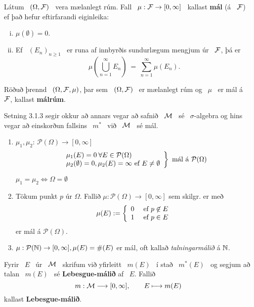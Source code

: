\documentclass[12pt]{report}
\newcommand{\cP}{\mathcal{P}}
\newcommand{\F}{{\cal F}}
\newcommand{\M}{{\cal M}}
\begin{document}
\begin{skgr*}
Látum  \ $(\Omega,\F)$ \ vera mælanlegt rúm. Fall \ $\mu : \F\rightarrow [0,\infty]$ \ kallast {\bf mál} (á \ $\F$) ef það hefur eftirfarandi eiginleika:
\begin{enumerate}[(i)]
\item
$\mu(\emptyset) = 0.$
\item
Ef \ $(E_n)_{n\geq 1}$ \ er runa af innbyrðis sundurlægum mengjum úr \ $\F$, þá er
\[
\mu\left(\bigcup_{n=1}^{\infty}E_n\right) \ = \ \sum_{n=1}^{\infty}\mu(E_n).
\]
\end{enumerate}
\end{skgr*}


Röðuð þrennd \ $(\Omega,\F,\mu)$, þar sem \ $(\Omega,\F)$ \ er mælanlegt rúm og \ $\mu$ \ er mál á \ $\F$, kallast {\bf málrúm}. 
 
 \begin{ath}
 Setning 3.1.3 segir okkur að annars vegar að safnið \ $\M$ \ sé \ $\sigma$-algebra og hins vegar að einskorðun fallsins \ $m^*$ \ við \ $\M$ \ sé mál.
 \end{ath}
 
\begin{daemi}
  \begin{enumerate}[\arabic*.]
  \item $\mu_1, \mu_2$: $\cP(\Omega) \to [0, \infty]$
    \[ \left. \begin{array}{l}
                \mu_1 (E) = 0 \: \forall E \in \cP(\Omega)\\
                \mu_2 (\emptyset) = 0, \mu_2(E)
                = \infty \Ef E \neq \emptyset \\
              \end{array}
            \right\} \text{ mál á $\cP(\Omega)$}
            \]
            \begin{ath}
              $\mu_1 = \mu_2 \Leftrightarrow \Omega = \emptyset$
            \end{ath}


          \item Tökum punkt $p$ úr $\Omega$. Fallið
            $\mu: \cP(\Omega) \to [0,\infty]$ sem skilgr. er
            með
            \[ \mu(E) := \left\{ \begin{array}{l l} 0 & \text{ ef } p \not\in E\\ 1 & \text{ ef } p
            \in E \end{array} \right. \] er mál á $\cP(\Omega)$.

          \item $\mu: \cP(\N) \to [0, \infty], \mu(E) = \#(E)$ er
            mál, oft kallað \emph{talningarmálið} á $\mathbb{N}$.
          \end{enumerate}


        \end{daemi}
\begin{skgr*}
Fyrir \ $E$ \ úr \ $\M$ \  skrifum við yfirleitt \ $m(E)$ \ í stað \ $m^*(E)$ \ og segjum að talan \ $m(E)$ \ sé {\bf Lebesgue-málið} af \ $E$. Fallið
\[
m : \M\longrightarrow[0,\infty],\qquad E\longmapsto m(E)
\]
kallast {\bf Lebesgue-málið}.
\end{skgr*}
\end{document}
